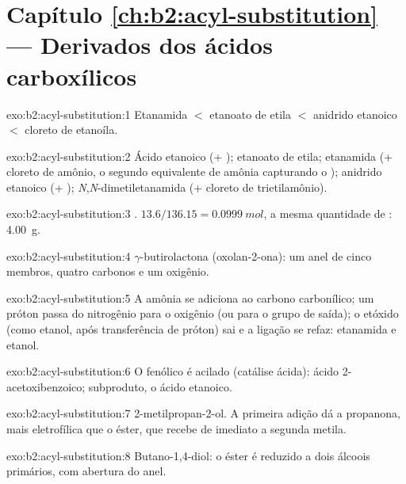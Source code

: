 \section*{Capítulo \ref{ch:b2:acyl-substitution} --- Derivados dos ácidos carboxílicos}

\begin{solution}{exo:b2:acyl-substitution:1}
Etanamida $<$ etanoato de etila $<$ anidrido etanoico $<$ cloreto de etanoíla.
\end{solution}

\begin{solution}{exo:b2:acyl-substitution:2}
Ácido etanoico (+ ); etanoato de etila; etanamida (+ cloreto de amônio, o segundo
equivalente de amônia capturando o ); anidrido etanoico (+ );
\textit{N},\textit{N}-dimetiletanamida (+ cloreto de trietilamônio).
\end{solution}

\begin{solution}{exo:b2:acyl-substitution:3}
. $13.6/136.15 = \qty{0.0999}{mol}$, a mesma quantidade
de : \qty{4.00}{g}.
\end{solution}

\begin{solution}{exo:b2:acyl-substitution:4}
$\gamma$-butirolactona (oxolan-2-ona): um anel de cinco membros, quatro carbonos e um oxigênio.
\end{solution}

\begin{solution}{exo:b2:acyl-substitution:5}
A amônia se adiciona ao carbono carbonílico; um próton passa do nitrogênio para o oxigênio (ou
para o grupo de saída); o etóxido (como etanol, após transferência de próton) sai e a ligação
 se refaz: etanamida e etanol.
\end{solution}

\begin{solution}{exo:b2:acyl-substitution:6}
O  fenólico é acilado (catálise ácida): ácido 2-acetoxibenzoico; subproduto, o ácido etanoico.
\end{solution}

\begin{solution}{exo:b2:acyl-substitution:7}
2-metilpropan-2-ol. A primeira adição dá a propanona, mais eletrofílica que o éster, que
recebe de imediato a segunda metila.
\end{solution}

\begin{solution}{exo:b2:acyl-substitution:8}
Butano-1,4-diol: o éster é reduzido a dois álcoois primários, com abertura do anel.
\end{solution}

